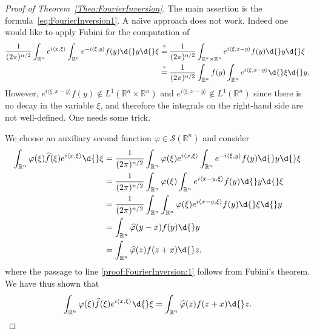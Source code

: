 \documentclass[12pt, oneside, a4paper]{article}
\theoremstyle{dfn}
\newcommand{\scalprod}[2]{\langle #1,#2 \rangle}
\def \S {\ensuremath{\mathcal{S}}}
\def \S {\ensuremath{\mathcal{S}}}
\def\Rbb{\ensuremath{\mathbb{R}}}
\begin{document}
\begin{proof}[Proof of Theorem~\ref{Theo:FourierInversion}]
The main assertion is the formula~\eqref{eq:FourierInversion1}. A na\"{\i}ve approach does not work. Indeed one would like to apply Fubini for the computation of
\begin{align*}
\frac{1}{(2\pi)^{n/2}} \int_{\Rbb^n} e^{i\scalprod{x}{\xi}} \int_{\Rbb^n} e^{-i\scalprod{\xi}{y}} f(y) \d{}y \d{}\xi
&\overset{?}{=} \frac{1}{(2\pi)^{n/2}} \int_{\Rbb^n \times \Rbb^n} e^{i\scalprod{\xi}{x-y}} f(y) \d{}y \d{}\xi \\
&\overset{?}{=} \frac{1}{(2\pi)^{n/2}} \int_{\Rbb^n} f(y) \int_{\Rbb^n} e^{i\scalprod{\xi}{x-y}} \d{}\xi \d{}y.
\end{align*}
However, $e^{i\scalprod{\xi}{x-y}} f(y) \notin L^1(\Rbb^n \times \Rbb^n)$ and $e^{i\scalprod{\xi}{x-y}} \notin L^1(\Rbb^n)$ since there is no decay in the variable $\xi$, and therefore the integrals on the right-hand side are not well-defined. One needs some trick.

We choose an auxiliary second function $\varphi \in \S(\Rbb^n)$ and consider
\begin{align}
	\int_{\Rbb^n} \varphi(\xi) \widehat{f} (\xi) e^{i\scalprod{x}{\xi}} \d{}\xi
	&= \frac{1}{(2\pi)^{n/2}} \int_{\Rbb^n} \varphi(\xi) e^{i\scalprod{x}{\xi}} \int_{\Rbb^n} e^{-i\scalprod{\xi}{y}} f(y) \d{}y \d{}\xi \nonumber \\
	&= \frac{1}{(2\pi)^{n/2}} \int_{\Rbb^n} \varphi(\xi) \int_{\Rbb^n} e^{i\scalprod{x-y}{\xi}} f(y) \d{}y \d{}\xi \nonumber \\
	&= \frac{1}{(2\pi)^{n/2}} \int_{\Rbb^n} \int_{\Rbb^n} \varphi(\xi) e^{i\scalprod{x-y}{\xi}} f(y) \d{}\xi \d{}y \label{proof:FourierInversion:1} \\
	&= \int_{\Rbb^n} \widehat{\varphi}(y-x) f(y) \d{}y \nonumber \\
	&= \int_{\Rbb^n} \widehat{\varphi}(z) f(z+x) \d{}z, \nonumber
\end{align}
where the passage to line \eqref{proof:FourierInversion:1} follows from Fubini's theorem. We have thus shown that
\begin{equation}\label{proof:FourierInversion:2}
\int_{\Rbb^n} \varphi(\xi) \widehat{f} (\xi) e^{i\scalprod{x}{\xi}} \d{}\xi
= \int_{\Rbb^n} \widehat{\varphi}(z) f(z+x) \d{}z.
\end{equation}


\end{proof}
\end{document}
